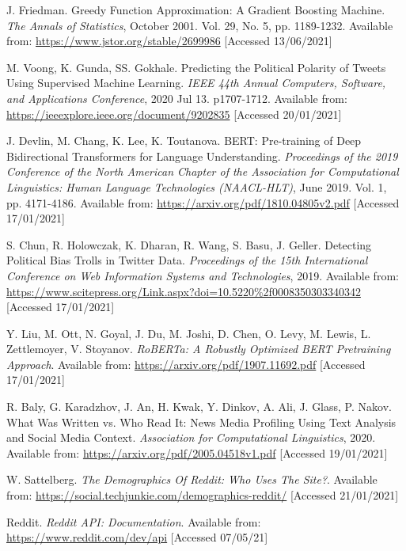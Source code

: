\begin{thebibliography}{9}
J. Friedman. Greedy Function Approximation: A Gradient Boosting Machine. \textit{The Annals of Statistics}, October 2001. Vol. 29, No. 5, pp. 1189-1232. Available from: \url{https://www.jstor.org/stable/2699986} [Accessed 13/06/2021]

M. Voong, K. Gunda, SS. Gokhale. Predicting the Political Polarity of Tweets Using Supervised Machine Learning. \textit{IEEE 44th Annual Computers, Software, and Applications Conference}, 2020 Jul 13. p1707-1712. Available from: \url{https://ieeexplore.ieee.org/document/9202835} [Accessed 20/01/2021]

J. Devlin, M. Chang, K. Lee, K. Toutanova. BERT: Pre-training of Deep Bidirectional Transformers for Language Understanding. \textit{Proceedings of the 2019 Conference of the North American Chapter of the Association for Computational Linguistics: Human Language Technologies (NAACL-HLT)}, June 2019. Vol. 1, pp. 4171-4186. Available from: \url{https://arxiv.org/pdf/1810.04805v2.pdf} [Accessed 17/01/2021]

S. Chun, R. Holowczak, K. Dharan, R. Wang, S. Basu, J. Geller. Detecting Political Bias Trolls in Twitter Data. \textit{Proceedings of the 15th International Conference on Web Information Systems and Technologies}, 2019. Available from: \url{https://www.scitepress.org/Link.aspx?doi=10.5220\%2f0008350303340342} [Accessed 17/01/2021]

Y. Liu, M. Ott, N. Goyal, J. Du, M. Joshi, D. Chen, O. Levy, M. Lewis, L. Zettlemoyer, V. Stoyanov. \textit{RoBERTa: A Robustly Optimized BERT Pretraining Approach}. Available from: \url{https://arxiv.org/pdf/1907.11692.pdf} [Accessed 17/01/2021]

R. Baly, G. Karadzhov, J. An, H. Kwak, Y. Dinkov, A. Ali, J. Glass, P. Nakov. What Was Written vs. Who Read It:
News Media Profiling Using Text Analysis and Social Media Context. \textit{Association for Computational Linguistics}, 2020. Available from: \url{https://arxiv.org/pdf/2005.04518v1.pdf} [Accessed 19/01/2021]

W. Sattelberg. \textit{The Demographics Of Reddit: Who Uses The Site?}. Available from: \url{https://social.techjunkie.com/demographics-reddit/} [Accessed 21/01/2021]

Reddit. \textit{Reddit API: Documentation}. Available from: \url{https://www.reddit.com/dev/api} [Accessed 07/05/21]


\end{thebibliography}
